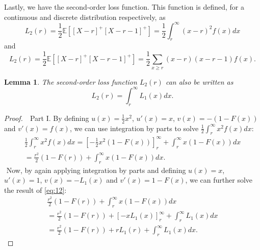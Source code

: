 \documentclass{article}
\newtheorem{lemma}{Lemma}
\begin{document}
\begin{flushleft}
    Lastly, we have the second-order loss function.
    This function is defined, for a continuous and discrete distribution respectively, as
    \begin{equation}
        L_2(r) = \frac{1}{2}\mathbb{E}[[X-r]^+[X-r-1]^+] = \frac{1}{2}\int_r^\infty (x-r)^2f(x)dx
    \end{equation}
    and
    \begin{equation}
        L_2(r) = \frac{1}{2}\mathbb{E}[[X-r]^+[X-r-1]^+] = \frac{1}{2}\sum_{x \ge r} (x-r)(x-r-1)f(x).
    \end{equation}
    \begin{lemma}
        The second-order loss function $L_2(r)$ can also be written as
        \begin{equation}
            L_2(r) = \int_{r}^{\infty}L_1(x)dx.
        \end{equation}
    \end{lemma}
    \begin{proof}
        $ $\newline
        $ $\newline
        Part I.
        By defining $u(x) = \frac{1}{2}x^2$, $u'(x) = x$, $v(x) = -(1-F(x))$ and $v'(x) = f(x)$, we can use integration by parts to solve $\frac{1}{2}\int_{r}^{\infty}x^2f(x)dx$:
        \begin{equation} \label{eq:12}
            \begin{gathered}
                \frac{1}{2}\int_{r}^{\infty}x^2f(x)dx = \left[-\frac{1}{2}x^2(1-F(x))\right]_{r}^{\infty} + \int_{r}^{\infty}x(1-F(x))dx \\
                = \frac{r^2}{2}(1-F(r))+\int_{r}^{\infty}x(1-F(x))dx.
            \end{gathered}
        \end{equation}
        $ $\newline
        Now, by again applying integration by parts and defining $u(x) = x$, $u'(x) = 1$, $v(x) = -L_1(x)$ and $v'(x) = 1-F(x)$, we can further solve the result of \ref{eq:12}:
        \begin{equation*}
            \begin{gathered}
                \frac{r^2}{2}(1-F(r))+\int_{r}^{\infty}x(1-F(x))dx \\
                = \frac{r^2}{2}(1-F(r))+\left[-xL_1(x)\right]_{r}^{\infty}+\int_{r}^{\infty}L_1(x)dx \\
                = \frac{r^2}{2}(1-F(r))+rL_1(r)+\int_{r}^{\infty}L_1(x)dx.

\end{gathered}
\end{equation*}
\end{proof}
\end{flushleft}
\end{document}
